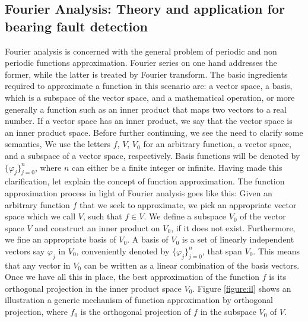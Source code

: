 \documentclass[11pt, oneside]{article}   	%
\begin{document}
\subsection{Fourier Analysis: Theory and application for bearing fault detection}
Fourier analysis is concerned with the general problem of periodic and non periodic functions approximation. Fourier series on one hand addresses the former, while the latter is treated by Fourier transform. The basic ingredients required to approximate a function in this scenario are: a vector space, a basis, which is a subspace of the vector space, and a mathematical operation, or more generally a function such as an inner product that maps two vectors to a real number. If a vector space has an inner product, we say that the vector space is an inner product space. 
\justify
Before further continuing, we see the need to clarify some semantics, We use the letters $f$, $V$, $V_{0}$ for an arbitrary function, a vector space, and a subspace of a vector space, respectively.
Basis functions will be denoted by $\{  \varphi_{j}\}_{j=0}^{n}$, where $n$ can either be a finite integer or infinite. Having made this clarification, let explain the concept of function approximation. 
\justify
The function approximation process in light of Fourier analysis goes like this: Given an arbitrary function $f$ that we seek to approximate, we pick an appropriate vector space which we call $V$, such that $f\in V$. We define a subspace $V_{0}$ of the vector space $V$ and construct an inner product on $V_{0}$, if it does not exist. Furthermore, we fine an appropriate basis of $V_{0}$.  A basis of $V_{0}$ is a set of linearly independent vectors say $\varphi_{j}$ in $V_{0}$, conveniently denoted by $\{ \varphi_{j}\}_{j=0}^{n}$, that span $V_{0}$. This means that any vector in $V_{0}$ can be written as a linear combination of the basis vectors. Once we have all this in place, the best approximation of the function $f$ is its orthogonal projection in the inner product space $V_{0}$. Figure \ref{figure:il} shows an illustration a generic mechanism of function approximation by orthogonal projection, where $f_{0}$ is the orthogonal projection of $f$ in the subspace $V_{0}$ of $V$.
\justify
\end{document}
